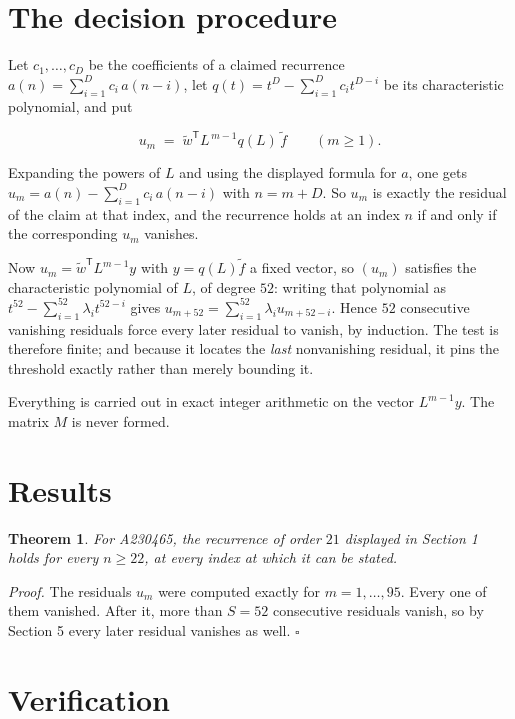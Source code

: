 \documentclass[11pt]{article}
\newtheorem{theorem}{Theorem}
\theoremstyle{definition}
\begin{document}
\section{The decision procedure}

Let $c_1,\dots,c_D$ be the coefficients of a claimed recurrence $a(n) = \sum_{i=1}^{D} c_i\,a(n-i)$, let $q(t) = t^{D} - \sum_{i=1}^{D} c_i t^{D-i}$ be its characteristic polynomial, and put

\[u_m \;=\; \tilde w^{\mathsf T} L^{\,m-1} q(L)\,\tilde f \qquad (m \ge 1).\]

Expanding the powers of $L$ and using the displayed formula for $a$, one gets $u_m = a(n) - \sum_{i=1}^{D} c_i\,a(n-i)$ with $n = m + D$. So $u_m$ is exactly the residual of the claim at that index, and the recurrence holds at an index $n$ if and only if the corresponding $u_m$ vanishes.

Now $u_m = \tilde w^{\mathsf T} L^{m-1} y$ with $y = q(L)\tilde f$ a fixed vector, so $(u_m)$ satisfies the characteristic polynomial of $L$, of degree $52$: writing that polynomial as $t^{52} - \sum_{i=1}^{52} \lambda_i t^{52-i}$ gives $u_{m+52} = \sum_{i=1}^{52} \lambda_i u_{m+52-i}$. Hence $52$ consecutive vanishing residuals force every later residual to vanish, by induction. The test is therefore finite; and because it locates the {\itshape last} nonvanishing residual, it pins the threshold exactly rather than merely bounding it.

Everything is carried out in exact integer arithmetic on the vector $L^{m-1}y$. The matrix $M$ is never formed.

\section{Results}

\begin{theorem} For A230465, the recurrence of order $21$ displayed in Section 1 holds for every $n \ge 22$, at every index at which it can be stated.\end{theorem}

{\itshape Proof.} The residuals $u_m$ were computed exactly for $m = 1,\dots,95$. Every one of them vanished. After it, more than $S = 52$ consecutive residuals vanish, so by Section 5 every later residual vanishes as well. $\square$

\section{Verification}
\end{document}
